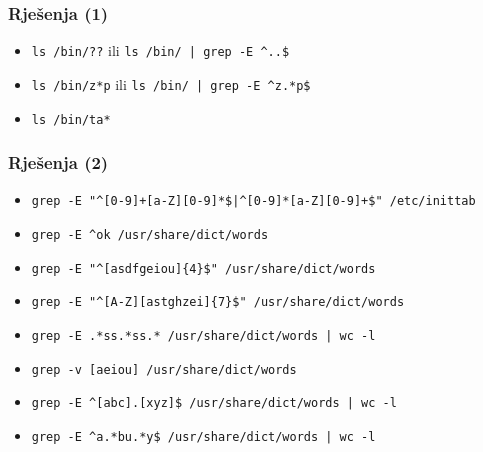 \documentclass[table,usenames,dvipsnames]{beamer}
\newcommand{\shell}[1]{\texttt{#1}}
\begin{document}
\begin{frame}[t]
\frametitle{Rješenja (1)}
\begin{itemize}
	\item \shell{ls /bin/??} ili \shell{ls /bin/ | grep -E \textasciicircum{}..\$}
	\item \shell{ls /bin/z*p} ili \shell{ls /bin/ | grep -E \textasciicircum{}z.*p\$}
	\item \shell{ls /bin/ta*}
\end{itemize}
\end{frame}

\begin{frame}[t]
\frametitle{Rješenja (2)}
\begin{itemize}
  \item \shell{grep -E "\textasciicircum{}[0-9]+[a-Z][0-9]*\$|\textasciicircum{}[0-9]*[a-Z][0-9]+\$" /etc/inittab}
  \item \shell{grep -E \textasciicircum{}ok /usr/share/dict/words}
  \item \shell{grep -E "\textasciicircum{}[asdfgeiou]\{4\}\$" /usr/share/dict/words}
  \item \shell{grep -E "\textasciicircum{}[A-Z][astghzei]\{7\}\$" /usr/share/dict/words}
  \item \shell{grep -E .*ss.*ss.* /usr/share/dict/words | wc -l}
  \item \shell{grep -v [aeiou] /usr/share/dict/words}
  \item \shell{grep -E \textasciicircum{}[abc].[xyz]\$ /usr/share/dict/words | wc -l}
  \item \shell{grep -E \textasciicircum{}a.*bu.*y\$ /usr/share/dict/words | wc -l}
\end{itemize}
\end{frame}
\end{document}
